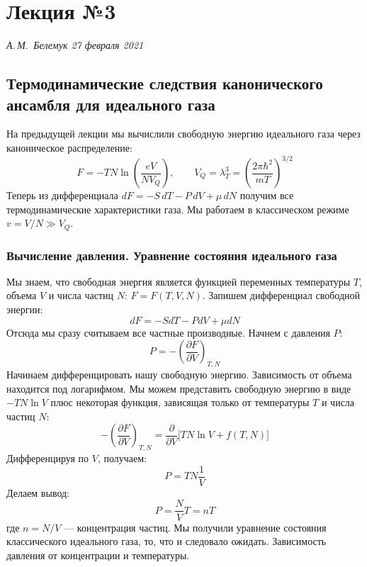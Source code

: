 \documentclass[../general/general]{subfiles}
\begin{document}
\chapter{Лекция №3}
\noindent\textit{А.\,М.~Белемук \hfill 27 февраля 2021}
\vspace{1em}
\ifSubfilesClassLoaded{\tableofcontents\newpage}{}


\section{Термодинамические следствия канонического ансамбля для идеального газа}

На предыдущей лекции мы вычислили свободную энергию идеального газа через каноническое распределение:
\begin{equation}
    F = -TN \ln \left( \frac{eV}{N V_Q} \right), \qquad V_Q = \lambda_T^3 = \left( \frac{2\pi\hbar^2}{mT} \right)^{3/2}
\end{equation}
Теперь из дифференциала $dF = -S\,dT - P\,dV + \mu\,dN$ получим все термодинамические характеристики газа. Мы работаем в классическом режиме $v = V/N \gg V_Q$.

\subsection{Вычисление давления. Уравнение состояния идеального газа}

Мы знаем, что свободная энергия является функцией переменных температуры $T$, объема $V$ и числа частиц $N$: $F = F(T, V, N)$. Запишем дифференциал свободной энергии:
\begin{equation}
    dF = -S dT - P dV + \mu dN
\end{equation}
Отсюда мы сразу считываем все частные производные. Начнем с давления $P$:
\begin{equation}
    P = -\left( \frac{\partial F}{\partial V} \right)_{T,N}
\end{equation}
Начинаем дифференцировать нашу свободную энергию. Зависимость от объема находится под логарифмом. Мы можем представить свободную энергию в виде $-TN \ln V$ плюс некоторая функция, зависящая только от температуры $T$ и числа частиц $N$:
\begin{equation}
    -\left( \frac{\partial F}{\partial V} \right)_{T,N} = \frac{\partial}{\partial V} \Big[ T N \ln V + f(T,N) \Big]
\end{equation}
Дифференцируя по $V$, получаем:
\begin{equation}
    P = T N \frac{1}{V}
\end{equation}
Делаем вывод:
\begin{equation}
    P = \frac{N}{V} T = n T
\end{equation}
где $n = N/V$ --- концентрация частиц. Мы получили уравнение состояния классического идеального газа, то, что и следовало ожидать. Зависимость давления от концентрации и температуры.
\end{document}
